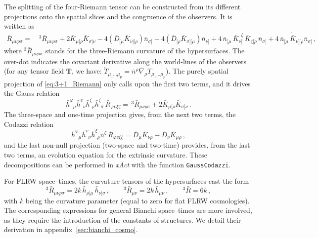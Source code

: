\documentclass[notitlepage,onecolumn,floatfix,preprintnumbers,aps,prd,showpacs,nofootinbib,amsmath,amssymb,amsfonts]{revtex4-1}
\newcommand{\be}{\begin{equation}}
\newcommand{\ee}{\end{equation}}
\newcommand{\<}{\langle}
\renewcommand{\>}{\rangle}
\begin{document}
The splitting of the four-Riemann tensor can be constructed from its different projections onto the spatial slices 
and the congruence of the observers. It is written as 
\begin{align}
	\bar R_{\mu \nu \rho \sigma} = 
		& \, {}^3 \! \bar{R}_{\mu \nu \rho \sigma} + 2 \bar K_{\mu [\rho} \bar K_{\sigma ] \nu}
		- 4 \left( \bar D_{[ \mu} \bar K_{\nu ] [ \rho} \right) \bar n_{\sigma ]}
		- 4 \left( \bar D_{[ \rho} \bar K_{\sigma ] [ \mu} \right) \bar n_{\nu ]} 
		+ 4 \, \bar n_{[ \mu} \, \bar K_{\nu ]}^{\phantom{\nu} \zeta} \, \bar K_{\zeta [ \rho} \, \bar n_{\sigma ]} 
		+ 4 \, \bar n_{[ \mu} \, \dot{\bar{K}}_{\nu ] [ \rho} \bar n_{\sigma ]} \, , 
		\label{eq:3+1_Riemann}
\end{align}
where ${}^3 \! \bar{R}_{\mu \nu \rho \sigma}$ stands for the three-Riemann curvature of the hypersurfaces. 
The over-dot indicates the covariant derivative along the world-lines of the observers 
(for any tensor field $\bm T$, we have: $\dot{T}_{\mu_1 \dots \mu_p} = \bar n^\rho \bar \nabla_\rho T_{\mu_1 \dots \mu_p}$). 
The purely spatial projection of \eqref{eq:3+1_Riemann} only calls upon the first two terms, and it drives the Gauss relation 
\be
	\bar h^\varphi_{\phantom{\alpha} \mu} \bar h^\upsilon_{\phantom{\upsilon} \nu} 
	\bar h^\xi_{\phantom{\xi} \rho} \bar h^\zeta_{\phantom{\zeta} \sigma} \, 
	\bar R_{\varphi \upsilon \xi \zeta} 
		= \, {}^3 \! \bar{R}_{\mu \nu \rho \sigma} + 2 \bar K_{\mu [ \rho} \bar K_{\sigma ] \nu} \, . 
\ee
The three-space and one-time projection gives, from the next two terms, the Codazzi relation 
\be
	\bar h^\varphi_{\phantom{\varphi} \mu} \bar
        h^\upsilon_{\phantom{\upsilon} \nu} \bar
        h^\xi_{\phantom{\xi} \rho} \bar n^\zeta \, 
	\bar R_{\varphi \upsilon \xi \zeta} 
		= \bar D_\mu \bar K_{\nu \rho} - \bar D_\nu \bar K_{\mu \rho} \, , 
	\label{eq:codazzi}
\ee
and the last non-null projection (two-space and two-time) provides, from the last two terms, an evolution equation for the extrinsic curvature. 
These decompositions can be performed in \textit{xAct} with the function {\tt GaussCodazzi}. 

For FLRW space--times, the curvature tensors of the hypersurfaces cast the form 
\be
	{}^3 \! \bar R_{\mu \nu \rho \sigma} 
		= 2 k \, \bar h_{\rho [ \mu} \, \bar h_{\nu] \sigma} \, , \qquad
	{}^3 \! \bar R_{\mu \nu} 
		= 2 k \, \bar h_{\mu \nu} \, , \qquad 
	{}^3 \! \bar R 
		= 6 k \, , 
	\label{eq:curv_tens_FLRW}
\ee
with $k$ being the curvature parameter (equal to zero for flat FLRW cosmologies). 
The corresponding expressions for general Bianchi space--times are more involved, 
as they require the introduction of the constants of structures.
We detail their derivation in appendix~\ref{sec:bianchi_cosmo}. 
\end{document}
